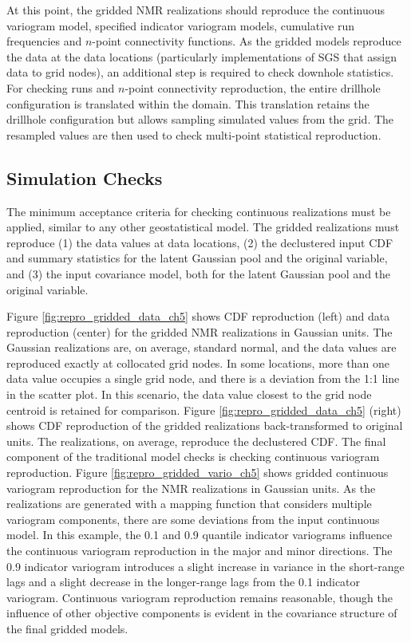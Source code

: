 At this point, the gridded \gls{NMR} realizations should reproduce the continuous variogram model, specified indicator variogram models, cumulative run frequencies and $n$-point connectivity functions. As the gridded models reproduce the data at the data locations (particularly implementations of \gls{SGS} that assign data to grid nodes), an additional step is required to check downhole statistics. For checking runs and $n$-point connectivity reproduction, the entire drillhole configuration is translated within the domain. This translation retains the drillhole configuration but allows sampling simulated values from the grid. The resampled values are then used to check multi-point statistical reproduction.

\FloatBarrier
\subsection{Simulation Checks}
\label{subsec:simcheck}

The minimum acceptance criteria for checking continuous realizations \citep{leuangthong2004minimum} must be applied, similar to any other geostatistical model. The gridded realizations must reproduce (1) the data values at data locations, (2) the declustered input \gls{CDF} and summary statistics for the latent Gaussian pool and the original variable, and (3) the input covariance model, both for the latent Gaussian pool and the original variable.

Figure \ref{fig:repro_gridded_data_ch5} shows \gls{CDF} reproduction (left) and data reproduction (center) for the gridded \gls{NMR} realizations in Gaussian units. The Gaussian realizations are, on average, standard normal, and the data values are reproduced exactly at collocated grid nodes. In some locations, more than one data value occupies a single grid node, and there is a deviation from the 1:1 line in the scatter plot. In this scenario, the data value closest to the grid node centroid is retained for comparison. Figure \ref{fig:repro_gridded_data_ch5} (right) shows \gls{CDF} reproduction of the gridded realizations back-transformed to original units. The realizations, on average, reproduce the declustered \gls{CDF}. The final component of the traditional model checks is checking continuous variogram reproduction. Figure \ref{fig:repro_gridded_vario_ch5} shows gridded continuous variogram reproduction for the \gls{NMR} realizations in Gaussian units. As the realizations are generated with a mapping function that considers multiple variogram components, there are some deviations from the input continuous model. In this example, the 0.1 and 0.9 quantile indicator variograms influence the continuous variogram reproduction in the major and minor directions. The 0.9 indicator variogram introduces a slight increase in variance in the short-range lags and a slight decrease in the longer-range lags from the 0.1 indicator variogram. Continuous variogram reproduction remains reasonable, though the influence of other objective components is evident in the covariance structure of the final gridded models.

